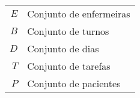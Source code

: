 
\begin{tabular}{rl}
$E$ & Conjunto de enfermeiras \\
$B$ & Conjunto de turnos \\
$D$ & Conjunto de dias \\
$T$ & Conjunto de tarefas \\
$P$ & Conjunto de pacientes
\end{tabular}